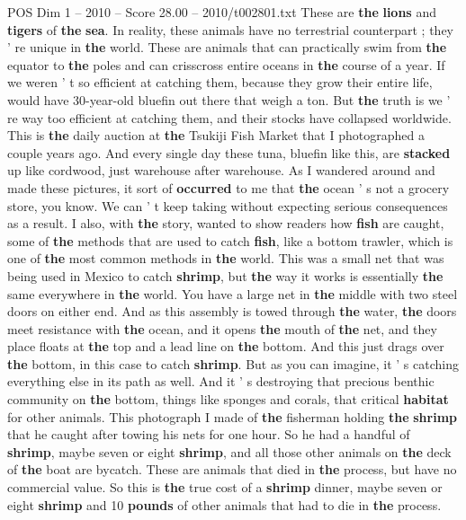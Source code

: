 \begin{textsample}{POS Dim 1 – 2010 – Score 28.00 – 2010/t002801.txt}
These are \textbf{the} \textbf{lions} and \textbf{tigers} of \textbf{the} \textbf{sea}.
In reality, these animals have no terrestrial counterpart ; they ' re unique in \textbf{the} world.
These are animals that can practically swim from \textbf{the} equator to \textbf{the} poles and can crisscross entire oceans in \textbf{the} course of a year.
If we weren ' t so efficient at catching them, because they grow their entire life, would have 30-year-old bluefin out there that weigh a ton.
But \textbf{the} truth is we ' re way too efficient at catching them, and their stocks have collapsed worldwide.
This is \textbf{the} daily auction at \textbf{the} Tsukiji Fish Market that I photographed a couple years ago.
And every single day these tuna, bluefin like this, are \textbf{stacked} up like cordwood, just warehouse after warehouse.
As I wandered around and made these pictures, it sort of \textbf{occurred} to me that \textbf{the} ocean ' s not a grocery store, you know.
We can ' t keep taking without expecting serious consequences as a result.
I also, with \textbf{the} story, wanted to show readers how \textbf{fish} are caught, some of \textbf{the} methods that are used to catch \textbf{fish}, like a bottom trawler, which is one of \textbf{the} most common methods in \textbf{the} world.
This was a small net that was being used in Mexico to catch \textbf{shrimp}, but \textbf{the} way it works is essentially \textbf{the} same everywhere in \textbf{the} world.
You have a large net in \textbf{the} middle with two steel doors on either end.
And as this assembly is towed through \textbf{the} water, \textbf{the} doors meet resistance with \textbf{the} ocean, and it opens \textbf{the} mouth of \textbf{the} net, and they place floats at \textbf{the} top and a lead line on \textbf{the} bottom.
And this just drags over \textbf{the} bottom, in this case to catch \textbf{shrimp}.
But as you can imagine, it ' s catching everything else in its path as well.
And it ' s destroying that precious benthic community on \textbf{the} bottom, things like sponges and corals, that critical \textbf{habitat} for other animals.
This photograph I made of \textbf{the} fisherman holding \textbf{the} \textbf{shrimp} that he caught after towing his nets for one hour.
So he had a handful of \textbf{shrimp}, maybe seven or eight \textbf{shrimp}, and all those other animals on \textbf{the} deck of \textbf{the} boat are bycatch.
These are animals that died in \textbf{the} process, but have no commercial value.
So this is \textbf{the} true cost of a \textbf{shrimp} dinner, maybe seven or eight \textbf{shrimp} and 10 \textbf{pounds} of other animals that had to die in \textbf{the} process.

\end{textsample}
